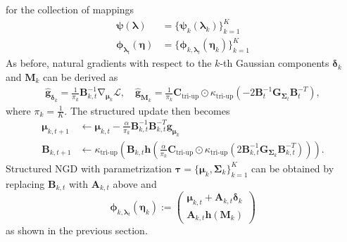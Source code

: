 \documentclass[a4paper, 11pt, oneside]{scrartcl}
\theoremstyle{break}
\DeclareMathOperator{\grad}{\nabla}
\newcommand{\matr}[1]{\boldsymbol{#1}}
\numberwithin{equation}{section}
\begin{document}
				for the collection of mappings
				\begin{align*}
					\matr{\psi} (\matr{\lambda}) &= \{ \matr{\psi}_k (\matr{\lambda}_k) \}_{k=1}^K \\
					\matr{\phi}_{\matr{\lambda}_t} (\matr{\eta}) &= \{ \matr{\phi}_{k, \matr{\lambda}_t} (\matr{\eta}_k) \}_{k=1}^K 
				\end{align*}
				As before, natural gradients with respect to the $k$-th Gaussian components $\matr{\delta}_k$ and $\matr{M}_k$ can be derived as 
				\begin{align*}
					\matr{\hat{g}}_{\matr{\delta}_k} = \frac{1}{\pi_k} \matr{B}_{k, t}^{-1} \grad_{\matr{\mu}_k} \mathcal{L}, \quad \matr{\hat{g}}_{\matr{M}_k} = \frac{1}{\pi_k} \matr{C}_{\text{tri-up}} \odot \kappa_{\text{tri-up}} (-2 \matr{B}_t^{-1} \matr{G}_{\matr{\Sigma}_t} \matr{B}_t^{-T} ),
				\end{align*}
				where $\pi_k = \frac{1}{K}$.
				The structured update then becomes 
				\begin{align*}
					\matr{\mu}_{k, t+1} &\leftarrow \matr{\mu}_{k, t} - \frac{\alpha}{\pi_k} \matr{B}_{k, t}^{-1} \matr{B}_{k, t}^{-T} \matr{g}_{\matr{\mu}_k} \\
					\matr{B}_{k, t+1} &\leftarrow \kappa_{\text{tri-up}} \left( \matr{B}_{k, t} \matr{h} \left(\frac{\alpha}{\pi_k} \matr{C}_{\text{tri-up}} \odot \kappa_{\text{tri-up}} (2 \matr{B}_{k, t}^{-1} \matr{G}_{\matr{\Sigma}_k} \matr{B}_{k, t}^{-T}) \right) \right).
				\end{align*}
				Structured NGD with parametrization $\matr{\tau} = \{\matr{\mu}_k, \matr{\Sigma}_k \}_{k=1}^K$ can be obtained by replacing $\matr{B}_{k, t}$ with $\matr{A}_{k, t}$ above and 
				\begin{equation*}
					\matr{\phi}_{k, \matr{\lambda}_t} (\matr{\eta}_k) := \begin{pmatrix} \matr{\mu}_{k, t} + \matr{A}_{k, t} \matr{\delta}_k \\ \matr{A}_{k, t} \matr{h} ( \matr{M}_k )\end{pmatrix}
				\end{equation*}
				as shown in the previous section.
\end{document}
